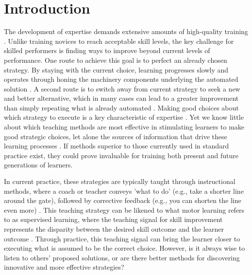 \documentclass[pdflatex,sn-mathphys-num]{sn-jnl}%
\theoremstyle{thmstyleone}%
\theoremstyle{thmstyletwo}%
\theoremstyle{thmstylethree}%
\begin{document}
\section{Introduction}

The development of expertise demands extensive amounts of high-quality training \cite{ericsson_role_1993, hodges_predicting_2004, vaeyens_talent_2009, sosniak_learning_1985}. Unlike training novices to reach acceptable skill levels, the key challenge for skilled performers is finding ways to improve beyond current levels of performance\cite{ericsson_development_2003, ericsson_scientific_1998, gray_plateaus_2017, williams_expertise_2008, du_relationship_2022}. One route to achieve this goal is to perfect an already chosen strategy. By staying with the current choice, learning progresses slowly and operates through honing the machinery components underlying the automated solution \cite{du_relationship_2022}. A second route is to switch away from current strategy to seek a new and better alternative, which in many cases can lead to a greater improvement than simply repeating what is already automated  \cite{gray_plateaus_2017, du_relationship_2022, krakauer_motor_2019}. Making good choices about which strategy to execute is a key characteristic of expertise \cite{ericsson_scientific_1998, ericsson_development_2003, krakauer_motor_2019, stanley_motor_2013}. Yet we know little about which teaching methods are most effective in stimulating learners to make good strategic choices, let alone the sources of information that drive these learning processes \cite{taylor_cerebellar_2014, taylor_role_2012}. If methods superior to those currently used in standard practice exist, they could prove invaluable for training both present and future generations of learners.

In current practice, these strategies are typically taught through instructional methods, where a coach or teacher conveys 'what to do' (e.g., take a shorter line around the gate), followed by corrective feedback (e.g., you can shorten the line even more) \cite{williams_practice_2005, williams_effective_2023, hodges_role_1999}. This teaching strategy can be likened to what motor learning refers to as supervised learning, where the teaching signal for skill improvement represents the disparity between the desired skill outcome and the learner outcome \cite{jordan_forward_1992, wolpert_motor_2010, doya_complementary_2000}. Through practice, this teaching signal can bring the learner closer to executing what is assumed to be the correct choice. However, is it always wise to listen to others' proposed solutions, or are there better methods for discovering innovative and more effective strategies?
\end{document}
